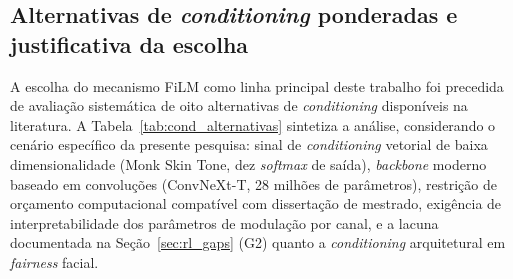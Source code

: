 \subsection{Alternativas de \emph{conditioning} ponderadas e justificativa da escolha}
\label{sec:rl_conditioning_alt}

A escolha do mecanismo FiLM como linha principal deste trabalho foi precedida de avaliação sistemática de oito alternativas de \emph{conditioning} disponíveis na literatura. A Tabela~\ref{tab:cond_alternativas} sintetiza a análise, considerando o cenário específico da presente pesquisa: sinal de \emph{conditioning} vetorial de baixa dimensionalidade (Monk Skin Tone, dez \emph{softmax} de saída), \emph{backbone} moderno baseado em convoluções (ConvNeXt-T, 28 milhões de parâmetros), restrição de orçamento computacional compatível com dissertação de mestrado, exigência de interpretabilidade dos parâmetros de modulação por canal, e a lacuna documentada na Seção~\ref{sec:rl_gaps} (G2) quanto a \emph{conditioning} arquitetural em \emph{fairness} facial.

